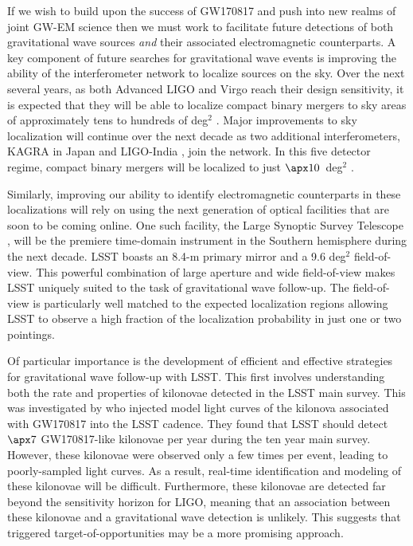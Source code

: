 If we wish to build upon the success of GW170817 and push into new realms of joint GW-EM science then we must work to facilitate future detections of both gravitational wave sources {\em and} their associated electromagnetic counterparts. A key component of future searches for gravitational wave events is improving the ability of the interferometer network to localize sources on the sky. Over the next several years, as both Advanced LIGO and Virgo reach their design sensitivity, it is expected that they will be able to localize compact binary mergers to sky areas of approximately tens to hundreds of deg$^2$ \citep{LIGOLocalization,ChenHolz16}. Major improvements to sky localization will continue over the next decade as two additional interferometers, KAGRA in Japan \citep{KAGRA} and LIGO-India \citep{LIGOIndia}, join the network. In this five detector regime, compact binary mergers will be localized to just $\apx10$~deg$^2$ \citep{Fairhurst2014,ChenHolz16}.

Similarly, improving our ability to identify electromagnetic counterparts in these localizations will rely on using the next generation of optical facilities that are soon to be coming online. One such facility, the Large Synoptic Survey Telescope \citep[LSST,][]{Ivezic+09}, will be the premiere time-domain instrument in the Southern hemisphere during the next decade. LSST boasts an 8.4-m primary mirror and a 9.6 deg$^2$ field-of-view. This powerful combination of large aperture and wide field-of-view makes LSST uniquely suited to the task of gravitational wave follow-up. The field-of-view is particularly well matched to the expected localization regions allowing LSST to observe a high fraction of the localization probability in just one or two pointings.

Of particular importance is the development of efficient and effective strategies for gravitational wave follow-up with LSST. This first involves understanding both the rate and properties of kilonovae detected in the LSST main survey. This was investigated by \citet{Scolnic+18} who injected model light curves of the kilonova associated with GW170817 \citep[hereafer just ``GW170817" for simplicity][]{Cowp+17} into the LSST cadence. They found that LSST should detect $\apx7$ GW170817-like kilonovae per year during the ten year main survey. However, these kilonovae were observed only a few times per event, leading to poorly-sampled light curves. As a result, real-time identification and modeling of these kilonovae will be difficult. Furthermore, these kilonovae are detected far beyond the sensitivity horizon for LIGO, meaning that an association between these kilonovae and a gravitational wave detection is unlikely. This suggests that triggered target-of-opportunities may be a more promising approach.

